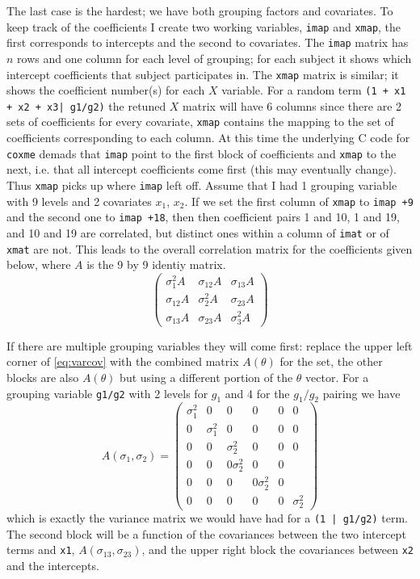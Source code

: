 \documentclass{article}
\begin{document}
The last case is the hardest; we have both grouping factors and
covariates.
To keep track of the coefficients I create two working variables,
\Verb!imap! and \Verb?xmap?, the first corresponds to intercepts
and the second to covariates.  
The \Verb!imap! matrix has $n$ rows and one column for each level
of grouping; for each subject it shows which intercept coefficients
that subject participates in.
The \Verb!xmap! matrix is similar; it shows the coefficient number(s) for
each $X$ variable.  
For a random term \Verb!(1 + x1 + x2 + x3| g1/g2)! the retuned $X$ matrix will
have 6 columns since there are 2 sets of coefficients for every covariate,
\Verb!xmap! contains the mapping to the set of coefficients corresponding to each column.
At this time the underlying C code for \Verb!coxme! demads that \Verb?imap? point
to the first block of coefficients and \Verb!xmap! to the next, i.e. that
all intercept coefficients come first (this may eventually change).
Thus \Verb!xmap! picks up where \Verb?imap? left off. 
Assume that I had 1 grouping variable with 9 levels and 2 covariates 
$x_1$, $x_2$.
If we set the first column of \Verb!xmap! to \Verb?imap +9? and the second
one to \Verb!imap +18!, then then coefficient pairs 1 and 10, 1 and 19, and
10 and 19 are correlated, but distinct ones within a column of \Verb!imat! or
of \Verb!xmat! are not.  
This leads to the overall correlation matrix for the coefficients given
below, where $A$ is the 9 by 9 identiy matrix.
\begin{equation}
\left( \begin{array}{ccc}
  \sigma^2_1 A & \sigma_{12} A & \sigma_{13}A \\
  \sigma_{12}A & \sigma_2^2 A &  \sigma_{23}A \\
  \sigma_{13}A & \sigma_{23}A &  \sigma_3^2 A \end{array} \right)
\label{eq:varcov}
\end{equation}

If there are multiple grouping variables they will come first:
replace the upper left corner of \ref{eq:varcov} with the 
combined matrix $A(\theta)$ for the set, the other blocks are also
$A(\theta)$ but using a different portion of the $\theta$ vector.
For a grouping variable \Verb!g1/g2! with 2 levels for $g_1$ and 4 for the $g_1/g_2$
pairing we have
$$
A(\sigma_1, \sigma_2) = \left( \begin{array}{cccccc}
  \sigma_1^2& 0&0&0&0&0 \\
  0&\sigma_1^2&0&0&0&0 \\
  0&0&\sigma_2^2&0&0&0 \\
  0&0&0 \sigma_2^2 &0&0 \\
  0&0&0&0 \sigma_2^2&0 \\
  0&0&0&0&0& \sigma_2^2 \end{array} \right)
$$
which is exactly the variance matrix we would have had for a \Verb!(1 | g1/g2)!
term.
The second block will be a function of the covariances between the two intercept
terms and \Verb!x1!, $A(\sigma_{13}, \sigma_{23})$, and the upper right block the
covariances between \Verb!x2! and the intercepts.
\end{document}
